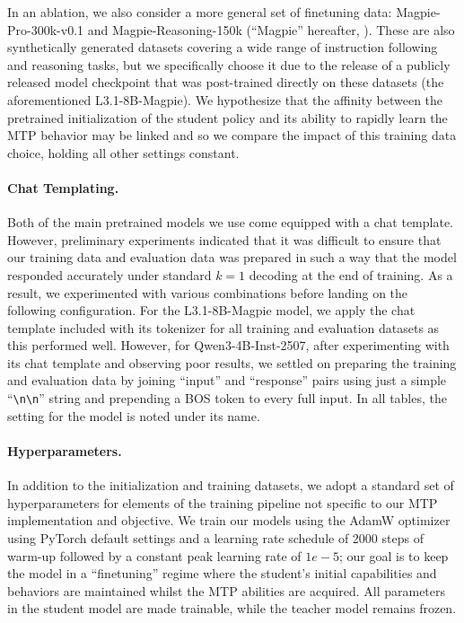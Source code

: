 \documentclass{article}
\theoremstyle{plain}
\theoremstyle{definition}
\theoremstyle{remark}
\begin{document}
In an ablation, we also consider a more general set of finetuning data: Magpie-Pro-300k-v0.1 and Magpie-Reasoning-150k (``Magpie'' hereafter, \citet{xu2024magpie}). These are also synthetically generated datasets covering a wide range of instruction following and reasoning tasks, but we specifically choose it due to the release of a publicly released model checkpoint that was post-trained directly on these datasets (the aforementioned L3.1-8B-Magpie). We hypothesize that the affinity between the pretrained initialization of the student policy and its ability to rapidly learn the MTP behavior may be linked and so we compare the impact of this training data choice, holding all other settings constant.

\paragraph{Chat Templating.}

Both of the main pretrained models we use come equipped with a chat template. However, preliminary experiments indicated that it was difficult to ensure that our training data and evaluation data was prepared in such a way that the model responded accurately under standard $k=1$ decoding at the end of training. As a result, we experimented with various combinations before landing on the following configuration. For the L3.1-8B-Magpie model, we apply the chat template included with its tokenizer for all training and evaluation datasets as this performed well. However, for Qwen3-4B-Inst-2507, after experimenting with its chat template and observing poor results, we settled on preparing the training and evaluation data by joining ``input'' and ``response'' pairs using just a simple ``\verb|\n\n|'' string and prepending a BOS token to every full input. In all tables, the setting for the model is noted under its name.

\paragraph{Hyperparameters.}

In addition to the initialization and training datasets, we adopt a standard set of hyperparameters for elements of the training pipeline not specific to our MTP implementation and objective. We train our models using the AdamW optimizer using PyTorch default settings and a learning rate schedule of 2000 steps of warm-up followed by a constant peak learning rate of $1e-5$; our goal is to keep the model in a ``finetuning'' regime where the student's initial capabilities and behaviors are maintained whilst the MTP abilities are acquired. All parameters in the student model are made trainable, while the teacher model remains frozen.
\end{document}
